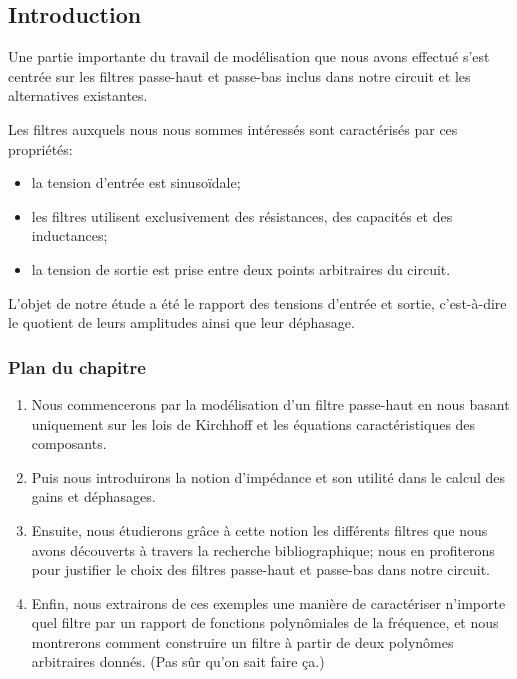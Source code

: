 \subsection*{Introduction}

Une partie importante du travail de modélisation que nous avons effectué
s'est centrée sur les filtres passe-haut et passe-bas inclus dans notre circuit
et les alternatives existantes.

Les filtres auxquels nous nous sommes intéressés sont caractérisés
par ces propriétés:
\begin{itemize}
    \item la tension d'entrée est sinusoïdale;
    \item les filtres utilisent exclusivement des résistances,
        des capacités et des inductances;
    \item la tension de sortie est prise entre deux points arbitraires
        du circuit.
\end{itemize}
L'objet de notre étude a été le rapport des tensions d'entrée et sortie,
c'est-à-dire le quotient de leurs amplitudes ainsi que leur déphasage.


\subsubsection*{Plan du chapitre}
\begin{enumerate}
    \item Nous commencerons par la modélisation
        d'un filtre passe-haut en nous basant uniquement sur les lois
        de Kirchhoff et les équations caractéristiques des composants.
    \item Puis nous introduirons la notion d'impédance et son utilité
        dans le calcul des gains et déphasages.
    \item Ensuite, nous étudierons grâce à cette notion
        les différents filtres que nous avons découverts à travers
        la recherche bibliographique; nous en profiterons pour justifier
        le choix des filtres passe-haut et passe-bas dans notre circuit.
    \item Enfin, nous extrairons de ces exemples une manière de caractériser
        n'importe quel filtre par un rapport de fonctions
        polynômiales de la fréquence, et nous montrerons comment construire
        un filtre à partir de deux polynômes arbitraires donnés.
        (Pas sûr qu'on sait faire ça.)
\end{enumerate}
